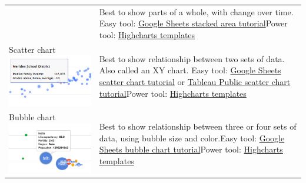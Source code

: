 \documentclass[
  english,
]{book}
\begin{document}
\begin{longtable}[]{@{}ll@{}}
\begin{minipage}[t]{0.47\columnwidth}
\end{minipage} & \begin{minipage}[t]{0.47\columnwidth}\raggedright
Best to show parts of a whole, with change over time. Easy tool: \href{pie-line-area-google}{Google Sheets stacked area tutorial}Power tool: \href{highcharts}{Highcharts templates}\strut
\end{minipage}\tabularnewline
\begin{minipage}[t]{0.47\columnwidth}\raggedright
Scatter chart \includegraphics{images/05-chart/chart-scatter.png}\strut
\end{minipage} & \begin{minipage}[t]{0.47\columnwidth}\raggedright
Best to show relationship between two sets of data. Also called an XY chart. Easy tool: \href{scatter-bubble-google}{Google Sheets scatter chart tutorial} or \href{scatter-chart-tableau}{Tableau Public scatter chart tutorial}Power tool: \href{highcharts}{Highcharts templates}\strut
\end{minipage}\tabularnewline
\begin{minipage}[t]{0.47\columnwidth}\raggedright
Bubble chart \includegraphics{images/05-chart/chart-bubble.png}\strut
\end{minipage} & \begin{minipage}[t]{0.47\columnwidth}\raggedright
Best to show relationship between three or four sets of data, using bubble size and color.Easy tool: \href{scatter-bubble-google}{Google Sheets bubble chart tutorial}Power tool: \href{highcharts}{Highcharts templates}\strut
\end{minipage}\tabularnewline
\bottomrule
\end{longtable}
\end{document}
